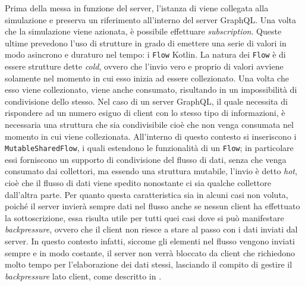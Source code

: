 
Prima della messa in funzione del server, l'istanza di  viene collegata alla simulazione e preserva un riferimento all'interno del server GraphQL.
Una volta che la simulazione viene azionata, è possibile effettuare \textit{subscription}. Queste ultime prevedono l'uso di strutture in grado di emettere una serie di valori in modo 
asincrono e duraturo nel tempo: i \texttt{Flow} Kotlin. La natura dei \texttt{Flow} è di essere strutture dette \textit{cold}, ovvero che l'invio vero e proprio di valori avviene solamente
nel momento in cui esso inizia ad essere collezionato. Una volta che esso viene collezionato, viene anche consumato, risultando in un impossibilità di condivisione dello stesso.
Nel caso di un server GraphQL, il quale necessita di rispondere ad un numero esiguo di client con lo stesso tipo di informazioni, è necessaria una struttura che sia condivisibile
cioè che non venga consumata nel momento in cui viene collezionata. All'interno di questo contesto si inseriscono i \texttt{MutableSharedFlow}, i quali estendono le funzionalità
di un \texttt{Flow}; in particolare essi forniscono un supporto di condivisione del flusso di dati, senza che venga consumato dai collettori, ma essendo una struttura mutabile,
l'invio è detto \textit{hot}, cioè che il flusso di dati viene spedito nonostante ci sia qualche collettore dall'altra parte. Per quanto questa caratteristica sia in alcuni casi
non voluta, poiché il server invierà sempre dati nel flusso anche se nessun client ha effettuato la sottoscrizione, essa risulta utile per tutti quei casi dove si può manifestare
\textit{backpressure}, ovvero che il client non riesce a stare al passo con i dati inviati dal server. In questo contesto infatti, siccome gli elementi nel flusso vengono inviati
sempre e in modo costante, il server non verrà bloccato da client che richiedono molto tempo per l'elaborazione dei dati stessi, lasciando il compito di gestire il \textit{backpressure}
lato client, come descritto in .

